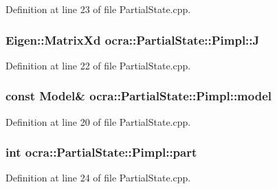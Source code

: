 Definition at line 23 of file Partial\+State.\+cpp.

\subsubsection[{\texorpdfstring{J}{J}}]{\setlength{\rightskip}{0pt plus 5cm}Eigen\+::\+Matrix\+Xd ocra\+::\+Partial\+State\+::\+Pimpl\+::J}\hypertarget{structocra_1_1PartialState_1_1Pimpl_a7c31cf81faa6abbbe780b9f143094418}{}\label{structocra_1_1PartialState_1_1Pimpl_a7c31cf81faa6abbbe780b9f143094418}


Definition at line 22 of file Partial\+State.\+cpp.

\subsubsection[{\texorpdfstring{model}{model}}]{\setlength{\rightskip}{0pt plus 5cm}const {\bf Model}\& ocra\+::\+Partial\+State\+::\+Pimpl\+::model}\hypertarget{structocra_1_1PartialState_1_1Pimpl_a45e5572b9e9cbe6ac2d9ba4107a58bd6}{}\label{structocra_1_1PartialState_1_1Pimpl_a45e5572b9e9cbe6ac2d9ba4107a58bd6}


Definition at line 20 of file Partial\+State.\+cpp.

\subsubsection[{\texorpdfstring{part}{part}}]{\setlength{\rightskip}{0pt plus 5cm}int ocra\+::\+Partial\+State\+::\+Pimpl\+::part}\hypertarget{structocra_1_1PartialState_1_1Pimpl_a605a55abed1d170fa6911088fefa7337}{}\label{structocra_1_1PartialState_1_1Pimpl_a605a55abed1d170fa6911088fefa7337}


Definition at line 24 of file Partial\+State.\+cpp.

